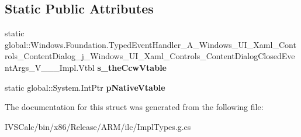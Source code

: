 \subsection*{Static Public Attributes}
\begin{DoxyCompactItemize}
\item 
\mbox{\label{struct_windows_1_1_foundation_1_1_typed_event_handler___a___windows___u_i___xaml___controls___co7a2cb13f58867dd2ebe18aa3ab56ee61_ad8f279e262b9ce39f6acc7aeb4f0ca1b}} 
static global\+::\+Windows.\+Foundation.\+Typed\+Event\+Handler\+\_\+\+A\+\_\+\+Windows\+\_\+\+U\+I\+\_\+\+Xaml\+\_\+\+Controls\+\_\+\+Content\+Dialog\+\_\+j\+\_\+\+Windows\+\_\+\+U\+I\+\_\+\+Xaml\+\_\+\+Controls\+\_\+\+Content\+Dialog\+Closed\+Event\+Args\+\_\+\+V\+\_\+\+\_\+\+\_\+\+Impl.\+Vtbl {\bfseries s\+\_\+the\+Ccw\+Vtable}
\item 
\mbox{\label{struct_windows_1_1_foundation_1_1_typed_event_handler___a___windows___u_i___xaml___controls___co7a2cb13f58867dd2ebe18aa3ab56ee61_ad1f483ee6489f7e8e4a6793150d03830}} 
static global\+::\+System.\+Int\+Ptr {\bfseries p\+Native\+Vtable}
\end{DoxyCompactItemize}


The documentation for this struct was generated from the following file\+:\begin{DoxyCompactItemize}
\item 
I\+V\+S\+Calc/bin/x86/\+Release/\+A\+R\+M/ilc/Impl\+Types.\+g.\+cs\end{DoxyCompactItemize}

